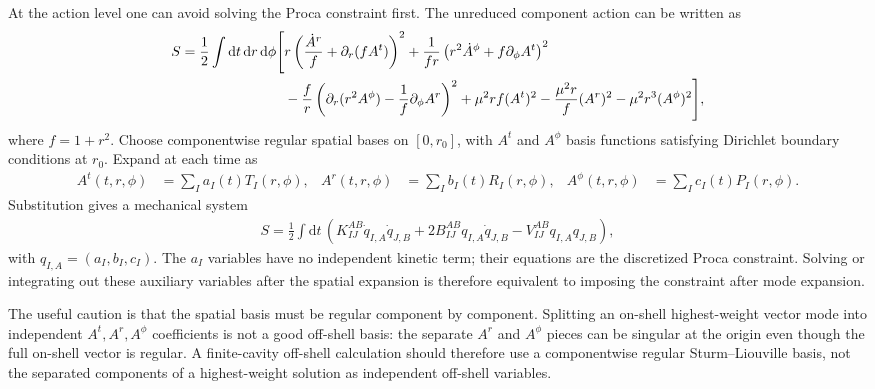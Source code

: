 \documentclass[11pt]{article}
\newcommand{\dd}{\mathrm{d}}
\newcommand{\pd}{\partial}
\begin{document}
At the action level one can avoid solving the Proca constraint first.  The
unreduced component action can be written as
\begin{align}
S=\frac12\int\dd t\,\dd r\,\dd\phi\Bigg[
&r\left(\frac{\dot A^r}{f}+\pd_r(fA^t)\right)^2
+\frac{1}{fr}\left(r^2\dot A^\phi+f\pd_\phi A^t\right)^2 \notag\\
&-\frac{f}{r}\left(\pd_r(r^2A^\phi)-\frac1f\pd_\phi A^r\right)^2
+\mu^2rf(A^t)^2-\frac{\mu^2r}{f}(A^r)^2-\mu^2r^3(A^\phi)^2
\Bigg],
\end{align}
where \(f=1+r^2\).  Choose componentwise regular spatial bases on
\([0,r_0]\), with \(A^t\) and \(A^\phi\) basis functions satisfying
Dirichlet boundary conditions at \(r_0\).  Expand at each time as
\begin{align}
A^t(t,r,\phi)&=\sum_I a_I(t)T_I(r,\phi),&
A^r(t,r,\phi)&=\sum_I b_I(t)R_I(r,\phi),&
A^\phi(t,r,\phi)&=\sum_I c_I(t)P_I(r,\phi).
\end{align}
Substitution gives a mechanical system
\begin{align}
S=\frac12\int\dd t\,
\left(K^{AB}_{IJ}\dot q_{I,A}\dot q_{J,B}
+2B^{AB}_{IJ}q_{I,A}\dot q_{J,B}
-V^{AB}_{IJ}q_{I,A}q_{J,B}\right),
\end{align}
with \(q_{I,A}=(a_I,b_I,c_I)\).  The \(a_I\) variables have no independent
kinetic term; their equations are the discretized Proca constraint.  Solving
or integrating out these auxiliary variables after the spatial expansion is
therefore equivalent to imposing the constraint after mode expansion.

The useful caution is that the spatial basis must be regular component by
component.  Splitting an on-shell highest-weight vector mode into independent
\(A^t,A^r,A^\phi\) coefficients is not a good off-shell basis: the separate
\(A^r\) and \(A^\phi\) pieces can be singular at the origin even though the full
on-shell vector is regular.  A finite-cavity off-shell calculation should
therefore use a componentwise regular Sturm--Liouville basis, not the separated
components of a highest-weight solution as independent off-shell variables.
\end{document}
